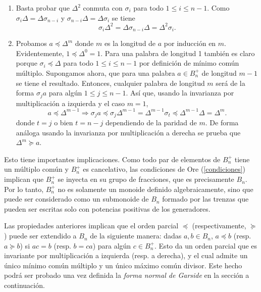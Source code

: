 \documentclass[bibtex, anon]{TEMat-article}
\begin{document}
\begin{demostracion}
\begin{enumerate}
		
		\item Basta probar que $\Delta^2$ conmuta con $\sigma_i$ para todo $1\leq i\leq n-1$. Como $\sigma_i\Delta=\Delta\sigma_{n-i}$ y $\sigma_{n-i}\Delta=\Delta\sigma_i$ se tiene
		\[
		\sigma_i\Delta^2=\Delta\sigma_{n-i}\Delta=\Delta^2\sigma_i.
		\]
		
		
		\item Probamos $a\preccurlyeq\Delta^m$ donde $m$ es la longitud de $a$ por inducción en $m$. Evidentemente, $1\preccurlyeq\Delta^0=1$. Para una palabra de longitud 1 también es claro porque $\sigma_i\preccurlyeq\Delta$ para todo $1\leq i\leq n-1$ por definición de mínimo común múltiplo. Supongamos ahora, que para una palabra $a\in B_n^+$ de longitud $m-1$ se tiene el resultado. Entonces, cualquier palabra de longitud $m$ será de la forma $\sigma_j a$ para algún $1\leq j\leq n-1$. Así que, usando la invarianza por multiplicación a izquierda y el caso $m=1$,
		\[
		a\preccurlyeq\Delta^{m-1}\Rightarrow \sigma_j a\preccurlyeq \sigma_j\Delta^{m-1} =\Delta^{m-1}\sigma_t\preccurlyeq \Delta^{m-1}\Delta=\Delta^{m}.
		\]
		donde $t=j$ o bien $t=n-j$ dependiendo de la paridad de $m$. De forma análoga usando la invarianza por multiplicación a derecha se prueba que $\Delta^m\succcurlyeq a$.
	\end{enumerate}
	
\end{demostracion}



Esto tiene importantes implicaciones. Como todo par de elementos de $B_n^+$ tiene un múltiplo común y $B_n^+$ es cancelativo, las condiciones de Ore (\cref{condiciones}) implican que $B_n^+$ se inyecta en su grupo de fracciones, que es precisamente $B_n$. Por lo tanto, $B_n^+$ no es solamente un monoide definido algebraicamente, sino que puede ser considerado como un submonoide de $B_n$ formado por las trenzas que pueden ser escritas solo con potencias positivas de los generadores. 

Las propiedades anteriores implican que el orden parcial $\preccurlyeq$ (respectivamente, $\succcurlyeq$) puede ser extendido a $B_n$ de la siguiente manera: dadas $a,b\in B_n$, $a\preccurlyeq b$ (resp. $a\succcurlyeq b$) si $ac=b$ (resp. $b=ca$) para algún $c\in B_n^+$. Esto da un orden parcial que es invariante por multiplicación a izquierda (resp. a derecha), y el cual admite un único mínimo común múltiplo y un único máximo común divisor. Este hecho podrá ser probado una vez definida la \emph{forma normal de Garside} en la sección a continuación.
\end{document}
